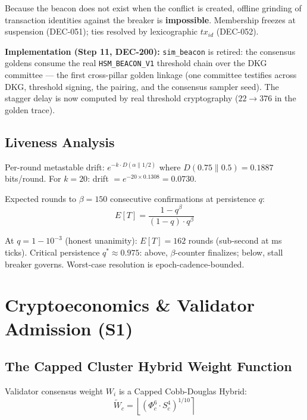 \documentclass[11pt, a4paper]{article}
\begin{document}
Because the beacon does not exist when the conflict is created, offline grinding of transaction identities against the breaker is \textbf{impossible}. Membership freezes at suspension (DEC-051); ties resolved by lexicographic $tx_{id}$ (DEC-052).

\textbf{Implementation (Step 11, DEC-200):} \texttt{sim\_beacon} is retired: the consensus goldens consume the real \texttt{HSM\_BEACON\_V1} threshold chain over the DKG committee --- the first cross-pillar golden linkage (one committee testifies across DKG, threshold signing, the pairing, and the consensus sampler seed). The stagger delay is now computed by real threshold cryptography ($22 \to 376$ in the golden trace).

\subsection{Liveness Analysis}

Per-round metastable drift: $e^{-k \cdot D(\alpha \| 1/2)}$ where $D(0.75 \| 0.5) = 0.1887$ bits/round. For $k = 20$: drift $= e^{-20 \times 0.1308} = 0.0730$.

Expected rounds to $\beta = 150$ consecutive confirmations at persistence $q$:
\begin{equation}
E[T] = \frac{1 - q^{\beta}}{(1-q) \cdot q^{\beta}}
\end{equation}

At $q = 1 - 10^{-3}$ (honest unanimity): $E[T] = 162$ rounds (sub-second at ms ticks). Critical persistence $q^* \approx 0.975$: above, $\beta$-counter finalizes; below, stall breaker governs. Worst-case resolution is epoch-cadence-bounded.

\section{Cryptoeconomics \& Validator Admission (S1)}

\subsection{The Capped Cluster Hybrid Weight Function}

Validator consensus weight $W_i$ is a Capped Cobb-Douglas Hybrid:
\begin{equation}
\tilde{W}_c = \left\lfloor (\Phi_c^6 \cdot S_c^4)^{1/10} \right\rceil
\end{equation}
\end{document}
